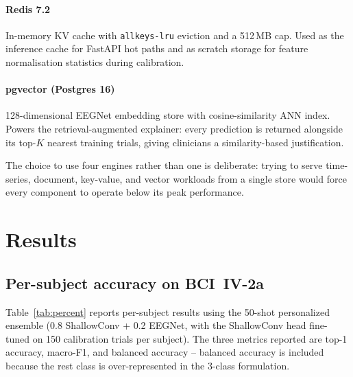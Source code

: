 \documentclass[conference]{IEEEtran}
\begin{document}
\paragraph{Redis 7.2} In-memory KV cache with \texttt{allkeys-lru} eviction
and a 512\,MB cap. Used as the inference cache for FastAPI hot paths and as
scratch storage for feature normalisation statistics during calibration.

\paragraph{pgvector (Postgres 16)} 128-dimensional EEGNet embedding store
with cosine-similarity ANN index. Powers the retrieval-augmented explainer:
every prediction is returned alongside its top-$K$ nearest training trials,
giving clinicians a similarity-based justification.

The choice to use four engines rather than one is deliberate: trying to
serve time-series, document, key-value, and vector workloads from a single
store would force every component to operate below its peak performance.

\section{Results}

\subsection{Per-subject accuracy on BCI~IV-2a}

Table~\ref{tab:percent} reports per-subject results using the 50-shot
personalized ensemble (0.8 ShallowConv + 0.2 EEGNet, with the ShallowConv
head fine-tuned on 150 calibration trials per subject). The three metrics
reported are top-1 accuracy, macro-F1, and balanced accuracy -- balanced
accuracy is included because the rest class is over-represented in the
3-class formulation.
\end{document}
